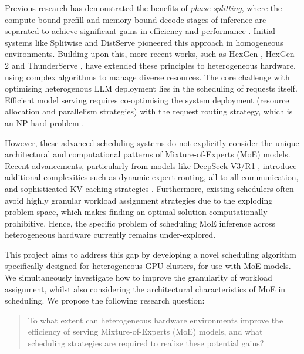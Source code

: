 Previous research has demonstrated the benefits of \textit{phase splitting}, where the compute-bound prefill and memory-bound decode stages of inference are separated to achieve significant gains in efficiency and performance \autocite{zhongDistServeDisaggregatingPrefill2024}.
Initial systems like Splitwise \autocite{patelSplitwiseEfficientGenerative2024} and DistServe \autocite{zhongDistServeDisaggregatingPrefill2024} pioneered this approach in homogeneous environments.
Building upon this, more recent works, such as HexGen \autocite{jiangHexGenGenerativeInference2024}, HexGen-2 \autocite{jiangHexGen2DisaggregatedGenerative2025} and ThunderServe \autocite{jiangThunderServeHighperformanceCostefficient2025}, have extended these principles to heterogeneous hardware, using complex algorithms to manage diverse resources. 
The core challenge with optimising heterogenous LLM deployment lies in the scheduling of requests itself.
Efficient model serving requires co-optimising the system deployment (resource allocation and parallelism strategies) with the request routing strategy, which is an NP-hard problem \autocite{jiangHexGenGenerativeInference2024}.

However, these advanced scheduling systems do not explicitly consider the unique architectural and computational patterns of Mixture-of-Experts (MoE) models.
Recent advancements, particularly from models like DeepSeek-V3/R1 \autocite{deepseek-aiDeepSeekR1IncentivizingReasoning2025}, introduce additional complexities such as dynamic expert routing, all-to-all communication, and sophisticated KV caching strategies \autocite{deepseek-aiDeepSeekV3TechnicalReport2025}.
Furthermore, existing schedulers often avoid highly granular workload assignment strategies due to the exploding problem space, which makes finding an optimal solution computationally prohibitive.
Hence, the specific problem of scheduling MoE inference across heterogeneous hardware currently remains under-explored.

This project aims to address this gap by developing a novel scheduling algorithm specifically designed for heterogeneous GPU clusters, for use with MoE models.
We simultaneously investigate how to improve the granularity of workload assignment, whilst also considering the architectural characteristics of MoE in scheduling.
We propose the following research question:
\begin{quote}
To what extent can heterogeneous hardware environments improve the efficiency of serving Mixture-of-Experts (MoE) models, and what scheduling strategies are required to realise these potential gains?
\end{quote}

